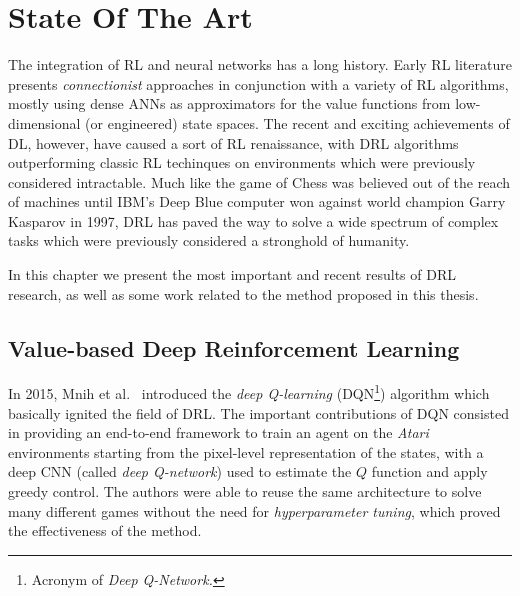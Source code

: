 \chapter{State Of The Art}
\label{chapter3_state_of_the_art}
\thispagestyle{empty}

\vspace{0.5cm}

The integration of RL and neural networks has a long history. Early 
RL literature \cite{rummery1994line, tesauro1995temporal, bertsekas1995neuro}
presents \textit{connectionist} approaches in conjunction with a variety
of RL algorithms, mostly using dense ANNs as approximators for the value 
functions from low-dimensional (or engineered) state spaces.
The recent and exciting achievements of DL, however, have caused a sort of RL 
renaissance, with DRL algorithms outperforming classic RL techinques on 
environments which were previously considered intractable. 
Much like the game of Chess was believed out of the reach of machines until 
IBM's Deep Blue computer \cite{campbell2002deep} won against world champion 
Garry Kasparov in 1997, DRL has paved the way to solve a wide spectrum of 
complex tasks which were previously considered a stronghold of humanity. 

In this chapter we present the most important and recent results of DRL research, 
as well as some work related to the method proposed in this thesis.

\section{Value-based Deep Reinforcement Learning} \label{SOA:value}
In 2015, Mnih et al.\ \cite{mnih2015human} introduced the \textit{deep 
Q-learning} (DQN\footnote{Acronym of \textit{Deep Q-Network.}}) algorithm which 
basically ignited the field of DRL.
The important contributions of DQN consisted in providing an end-to-end 
framework to train an agent on the \textit{Atari} environments starting from 
the pixel-level representation of the states, with a deep CNN (called 
\textit{deep Q-network}) used to estimate the $Q$ function and apply greedy 
control. The authors were able to reuse the same architecture to solve many 
different games without the need for \textit{hyperparameter tuning}, which 
proved the effectiveness of the method.

